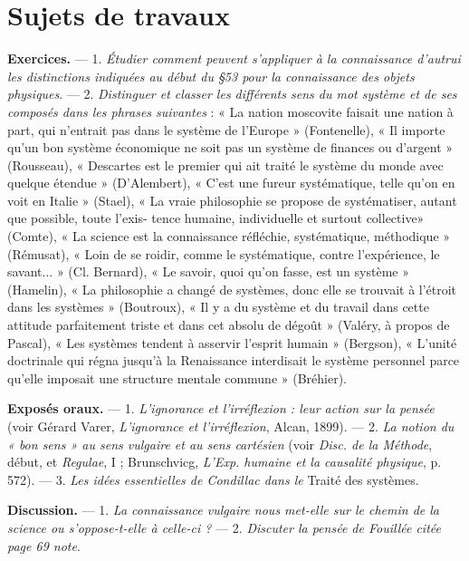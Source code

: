 \section{Sujets de travaux}%


{\bf Exercices.} — 1. {\it Étudier comment peuvent s'appliquer à la connaissance
d'autrui les distinctions indiquées au début du \S 53 pour la connaissance des
objets physiques}. — 2. {\it Distinguer et classer les différents sens du mot système
et de ses composés dans les phrases suivantes} : « La nation moscovite faisait
une nation à part, qui n’entrait pas dans le système de l’Europe » (Fontenelle),
« Il importe qu’un bon système économique ne soit pas un système
de finances ou d'argent » (Rousseau), « Descartes est le premier qui ait
traité le système du monde avec quelque étendue » (D'Alembert), « C'est
une fureur systématique, telle qu'on en voit en Italie » (Stael), « La vraie
philosophie se propose de systématiser, autant que possible, toute l’exis-
tence humaine, individuelle et surtout collective» (Comte), « La science
est la connaissance réfléchie, systématique, méthodique » (Rémusat),
« Loin de se roidir, comme le systématique, contre l'expérience, le savant... »
(Cl. Bernard), « Le savoir, quoi qu’on fasse, est un système » (Hamelin),
« La philosophie a changé de systèmes, donc elle se trouvait à l’étroit dans
les systèmes » (Boutroux), « Il y a du système et du travail dans cette
attitude parfaitement triste et dans cet absolu de dégoût » (Valéry, à
propos de Pascal), « Les systèmes tendent à asservir l'esprit humain »
(Bergson), « L'unité doctrinale qui régna jusqu'à la Renaissance interdisait
le système personnel parce qu’elle imposait une structure mentale
commune » (Bréhier).

{\bf Exposés oraux.} — 1. {\it L’ignorance et l'irréflexion : leur action sur la pensée}
(voir Gérard Varer, {\it L'ignorance et l'irréflexion}, Alcan, 1899). — 2. {\it La
notion du « bon sens » au sens vulgaire et au sens cartésien} (voir {\it Disc. de la
Méthode}, début, et {\it Regulae}, I ; Brunschvicg, {\it L’Exp. humaine et la causalité
physique}, p. 572). — 3. {\it Les idées essentielles de Condillac dans le} Traité des
systèmes.

{\bf Discussion.} — 1. {\it La connaissance vulgaire nous met-elle sur le chemin de
la science ou s'oppose-t-elle à celle-ci ?} — 2. {\it Discuter la pensée de Fouillée
citée page 69 note}.

